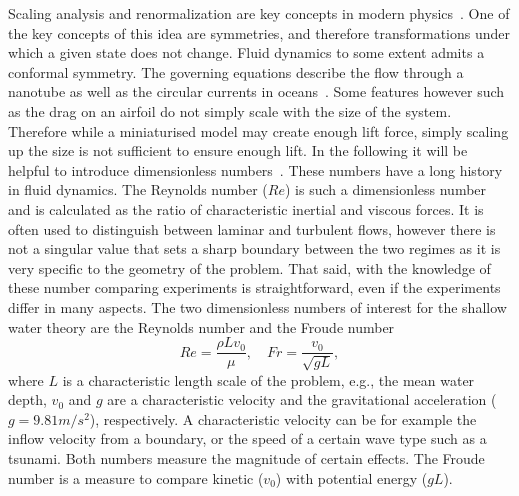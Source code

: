 Scaling analysis and renormalization are key concepts in modern physics~\cite{yakhotRenormalizationGroupAnalysis1986, IntroductionQuantumField2018}.
One of the key concepts of this idea are symmetries, and therefore transformations under which a given state does not change.
Fluid dynamics to some extent admits a conformal symmetry.
The governing equations describe the flow through a nanotube as well as the circular currents in oceans~\cite{secchiMassiveRadiusdependentFlow2016, marcheDerivationNewTwodimensional2007}.
Some features however such as the drag on an airfoil do not simply scale with the size of the system.
Therefore while a miniaturised model may create enough lift force, simply scaling up the size is not sufficient to ensure enough lift.  
In the following it will be helpful to introduce dimensionless numbers~\cite{ruzickaDimensionlessNumbers2008,neversFluidMechanicsChemical2019}.
These numbers have a long history in fluid dynamics.
The Reynolds number ($Re$) is such a dimensionless number and is calculated as the ratio of characteristic inertial and viscous forces.
It is often used to distinguish between laminar and turbulent flows, however there is not a singular value that sets a sharp boundary between the two regimes as it is very specific to the geometry of the problem.
That said, with the knowledge of these number comparing experiments is straightforward, even if the experiments differ in many aspects.
The two dimensionless numbers of interest for the shallow water theory are the Reynolds number and the Froude number
\begin{equation}\label{eq:Re_and_Fr}
    Re = \frac{\rho L v_0}{\mu},\quad Fr = \frac{v_0}{\sqrt{g L}},
\end{equation}
where $L$ is a characteristic length scale of the problem, e.g., the mean water depth, $v_0$ and $g$ are a characteristic velocity and the gravitational acceleration ($g = 9.81 m/s^2$), respectively.
A characteristic velocity can be for example the inflow velocity from a boundary, or the speed of a certain wave type such as a tsunami.
Both numbers measure the magnitude of certain effects.
The Froude number is a measure to compare kinetic ($v_0$) with potential energy ($g L$).

